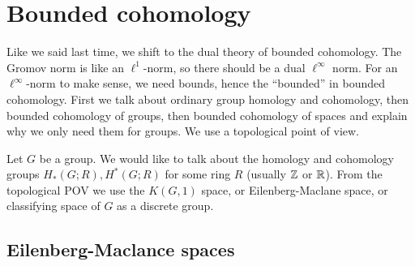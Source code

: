 \section{Bounded cohomology} 
Like we said last time, we shift to the dual theory of bounded cohomology. The Gromov norm is like an $\ell^1$-norm, so there should be a dual $\ell^{\infty}$ norm. For an $\ell^{\infty}$-norm to make sense, we need bounds, hence the ``bounded'' in bounded cohomology. First we talk about ordinary group homology and cohomology, then bounded cohomology of groups, then bounded cohomology of spaces and explain why we only need them for groups. We use a topological point of view.

Let $G$ be a group. We would like to talk about the homology and cohomology groups $H_*(G;R),H^*(G;R)$ for some ring $R$ (usually $\mathbb{Z}$ or $\mathbb{R}$). From the topological POV we use the $K(G,1)$ space, or Eilenberg-Maclane space, or classifying space of $G$ as a discrete group.
 \subsection{Eilenberg-Maclance spaces}


